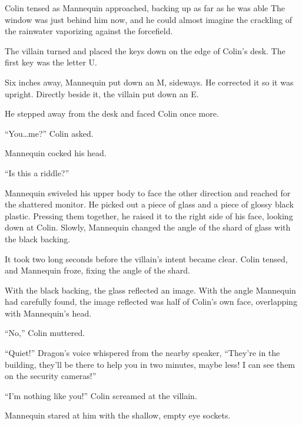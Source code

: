 Colin tensed as Mannequin approached, backing up as far as he was able  The window was just behind him now, and he could almost imagine the crackling of the rainwater vaporizing against the forcefield.



The villain turned and placed the keys down on the edge of Colin's desk.  The first key was the letter U.



Six inches away, Mannequin put down an M, sideways.  He corrected it so it was upright.  Directly beside it, the villain put down an E.



He stepped away from the desk and faced Colin once more.



``You\ldots me?''  Colin asked.



Mannequin cocked his head.



``Is this a riddle?''



Mannequin swiveled his upper body to face the other direction and reached for the shattered monitor.  He picked out a piece of glass and a piece of glossy black plastic.  Pressing them together, he raised it to the right side of his face, looking down at Colin.  Slowly, Mannequin changed the angle of the shard of glass with the black backing.



It took two long seconds before the villain's intent became clear.  Colin tensed, and Mannequin froze, fixing the angle of the shard.



With the black backing, the glass reflected an image.  With the angle Mannequin had carefully found, the image reflected was half of Colin's own face, overlapping with Mannequin's head.



``No,'' Colin muttered.



``Quiet!''  Dragon's voice whispered from the nearby speaker, ``They're in the building, they'll be there to help you in two minutes, maybe less!  I can see them on the security cameras!''



``I'm nothing like you!''  Colin screamed at the villain.



Mannequin stared at him with the shallow, empty eye sockets.



